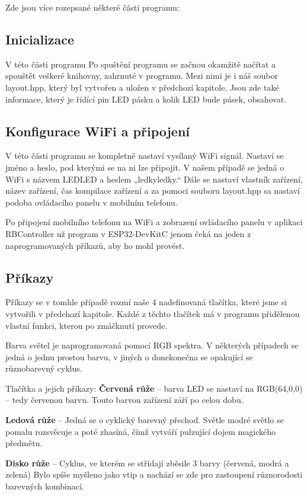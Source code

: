 Zde jsou více rozepsané některé části programu:


\subsection{Inicializace}
V této části programu Po spuštění programu se začnou okamžitě načítat a spouštět veškeré knihovny, zahrnuté v programu. Mezi nimi je i náš soubor layout.hpp, který byl vytvořen a uložen v předchozí kapitole. Jsou zde také informace, který je řídící pin LED pásku a kolik LED bude pásek, obsahovat.


\subsection{Konfigurace WiFi a připojení}
V této části programu se kompletně nastaví vysílaný WiFi signál. Nastaví se jméno a heslo, pod kterými se na ni lze připojit. V našem případě se jedná o WiFi s názvem LEDLED a heslem „ledkyledky.“ Dále se nastaví vlastník zařízení, název zařízení, čas kompilace zařízení a za pomoci souboru layout.hpp sa nastaví podoba ovládacího panelu v mobilním telefonu. 

Po připojení mobilního telefonu na WiFi a zobrazení ovládacího panelu v aplikaci RBController už program v ESP32-DevKitC jenom čeká na jeden z naprogramovaných příkazů, aby ho mohl provést.


\subsection{Příkazy}
Příkazy se v tomhle případě rozmí naše 4 nadefinovaná tlačítka, které jsme si vytvořili v předchozí kapitole. Každé z těchto tlačítek má v programu přidělenou vlastní funkci, kterou po zmáčknutí provede.

Barva světel je naprogramovaná pomocí RGB spektra. V některých případech se jedná o jednu prostou barvu, v jiných o donekonečna se opakující se různobarevný cyklus. 

Tlačítka a jejich příkazy: 
\textbf{Červená růže} – barva LED se nastaví na RGB(64,0,0) – tedy červenou barvu. Touto barvou zařízení září po celou dobu. 

\textbf{Ledová růže} – Jedná se o cyklický barevný přechod. Světle modré světlo se pomalu rozsvěcuje a poté zhasíná, čímž vytváří pulzující dojem magického předmětu. 

\textbf{Disko růže} – Cyklus, ve kterém se střídají zběsile 3 barvy (červená, modrá a zelená) Bylo spíše myšleno jako vtip a nachází se zde pro zastoupení různorodosti barevných kombinací. 

